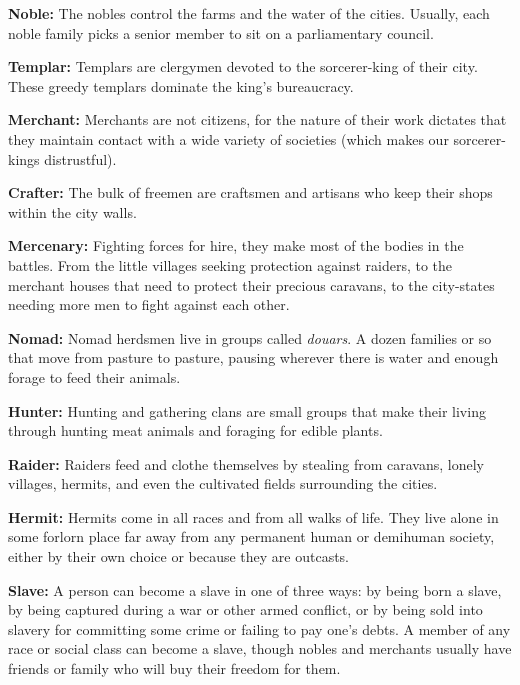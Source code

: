 \begin{itemize*}
	\item \textbf{Noble:} The nobles control the farms and the water of the cities. Usually, each noble family picks a senior member to sit on a parliamentary council.
	\item \textbf{Templar:} Templars are clergymen devoted to the sorcerer-king of their city. These greedy templars dominate the king's bureaucracy.
	\item \textbf{Merchant:} Merchants are not citizens, for the nature of their work dictates that they maintain contact with a wide variety of societies (which makes our sorcerer-kings distrustful).
	\item \textbf{Crafter:}  The bulk of freemen are craftsmen and artisans who keep their shops within the city walls.
	\item \textbf{Mercenary:} Fighting forces for hire, they make most of the bodies in the battles. From the little villages seeking protection against raiders, to the merchant houses that need to protect their precious caravans, to the city-states needing more men to fight against each other.
	\item \textbf{Nomad:} Nomad herdsmen live in groups called \textit{douars}. A dozen families or so that move from pasture to pasture, pausing wherever there is water and enough forage to feed their animals. %
	\item \textbf{Hunter:} Hunting and gathering clans are small groups that make their living through hunting meat animals and foraging for edible plants.
	\item \textbf{Raider:} Raiders feed and clothe themselves by stealing from caravans, lonely villages, hermits, and even the cultivated fields surrounding the cities. %
	\item \textbf{Hermit:} Hermits come in all races and from all walks of life. They live alone in some forlorn place far away from any permanent human or demihuman society, either by their own choice or because they are outcasts.
	\item \textbf{Slave:} A person can become a slave in one of three ways: by being born a slave, by being captured during a war or other armed conflict, or by being sold into slavery for committing some crime or failing to pay one's debts. A member of any race or social class can become a slave, though nobles and merchants usually have friends or family who will buy their freedom for them.
\end{itemize*}



